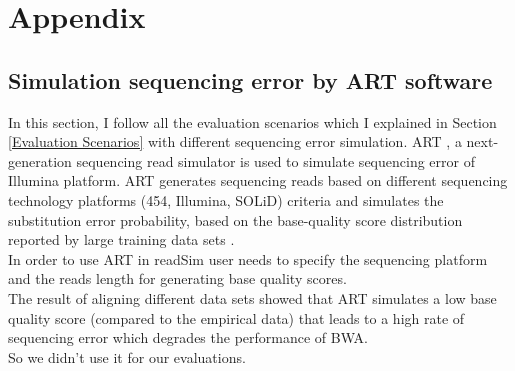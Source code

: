 \documentclass[11pt,a4paper]{report}
\begin{document}

\newpage
\appendix
\section*{Appendix}
\renewcommand{\thesubsection}{\Alph{subsection}}

\subsection{Simulation sequencing error by ART software} 
\label{Simulation sequencing error by ART software}

In this section, I follow all the evaluation scenarios which I explained in
Section \ref{Evaluation Scenarios}  with different sequencing error simulation.
ART \cite{art}, a next-generation sequencing read simulator is used to simulate sequencing
error of Illumina platform. 
ART generates sequencing reads based on different sequencing technology 
platforms (454, Illumina, SOLiD) criteria \cite{art} and simulates the
substitution error probability, based on the base-quality 
score distribution reported by large training data sets \cite{art}.\\

In order to use ART in readSim user needs to specify the sequencing
platform and the reads length for generating base quality scores.\\

The result of aligning different data sets showed that ART simulates a
low base quality score (compared to the empirical data) that leads to 
a high rate of sequencing error which degrades the performance of BWA.\\

So we didn't use it for our evaluations. \\
\end{document}
